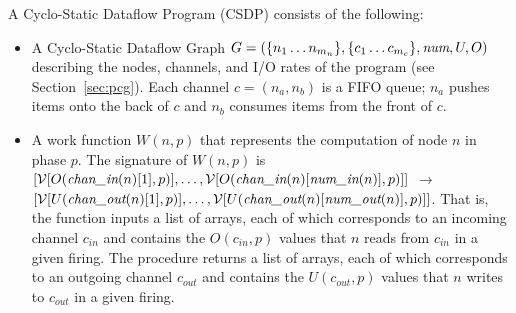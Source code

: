 \noindent A Cyclo-Static Dataflow Program (CSDP) consists of the
following:
\begin{itemize}

\item A Cyclo-Static Dataflow Graph $G = (\{n_1 \dots n_{m_n}\}, \{c_1
\dots c_{m_c}\}, \mbox{\it num}, U, O)$ describing the nodes,
channels, and I/O rates of the program (see Section~\ref{sec:pcg}).
Each channel $c = (n_a, n_b)$ is a FIFO queue; $n_a$ pushes items onto
the back of $c$ and $n_b$ consumes items from the front of $c$.

%
\item A work function $W(n, p)$ that represents the computation of
node $n$ in phase $p$.  The signature of $W(n, p)$ is $[{\cal
V}[O(\mbox{\it chan\_in}(n)[1], p)], \dots, {\cal
V}[O(\mbox{\it chan\_in}(n)[\mbox{\it num\_in}(n)], p)]]$ $\rightarrow$ $[
{\cal V}[U(\mbox{\it chan\_out}(n)[1], p)], \dots, {\cal
V}[U(\mbox{\it chan\_out}(n)[\mbox{\it num\_out}(n)], p)]]$.  That is, the
function inputs a list of arrays, each of which corresponds to an
incoming channel $c_{in}$ and contains the $O(c_{in},p)$ values that
$n$ reads from $c_{in}$ in a given firing.  The procedure returns a
list of arrays, each of which corresponds to an outgoing channel
$c_{out}$ and contains the $U(c_{out},p)$ values that $n$ writes to
$c_{out}$ in a given firing.

\end{itemize}


